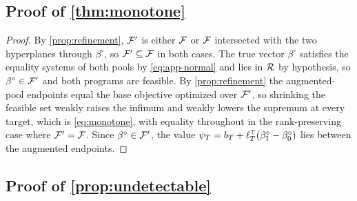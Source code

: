 \subsection{Proof of \texorpdfstring{\cref{thm:monotone}}{Theorem 1}}
\label{app:proof-monotone}

\begin{proof}
By \cref{prop:refinement}, $\mathcal F'$ is either $\mathcal F$ or
$\mathcal F$ intersected with the two hyperplanes through
$\beta^\circ$, so $\mathcal F'\subseteq\mathcal F$ in both cases. The true
vector $\beta^\circ$ satisfies the equality systems of both pools by
\eqref{eq:app-normal} and lies in $\mathcal R$ by hypothesis, so
$\beta^\circ\in\mathcal F'$ and both programs are feasible. By
\cref{prop:refinement} the augmented-pool endpoints equal the base
objective optimized over $\mathcal F'$, so shrinking the feasible set
weakly raises the infimum and weakly lowers the supremum at every
target, which is \eqref{eq:monotone}, with equality throughout in the
rank-preserving case where $\mathcal F'=\mathcal F$. Since
$\beta^\circ\in\mathcal F'$, the value
$\psi_T=b_T+\ell_T^\top(\beta^\circ_1-\beta^\circ_0)$ lies between the
augmented endpoints.
\end{proof}

\subsection{Proof of \texorpdfstring{\cref{prop:undetectable}}{the proposition on undetectable conflict}}
\label{app:proof-undetectable}

